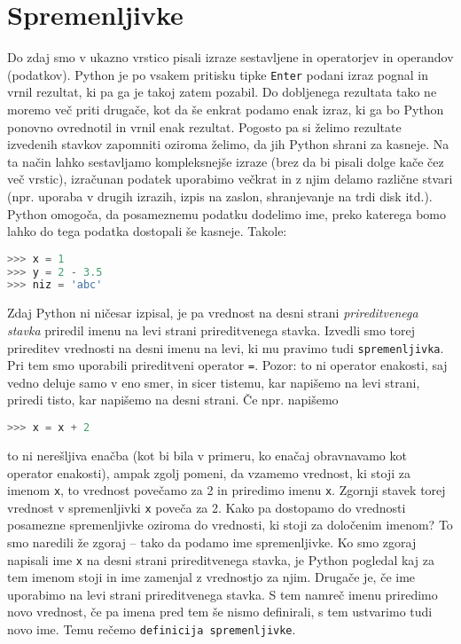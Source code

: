 \section{Spremenljivke}
Do zdaj smo v ukazno vrstico pisali izraze sestavljene in operatorjev in operandov (podatkov). Python je po vsakem pritisku tipke \texttt{Enter} podani izraz pognal in vrnil rezultat, ki pa ga je takoj zatem pozabil. Do dobljenega rezultata tako ne moremo več priti drugače, kot da še enkrat podamo enak izraz, ki ga bo Python ponovno ovrednotil in vrnil enak rezultat. Pogosto pa si želimo rezultate izvedenih stavkov zapomniti oziroma želimo, da jih Python shrani za kasneje. Na ta način lahko sestavljamo kompleksnejše izraze (brez da bi pisali dolge kače čez več vrstic), izračunan podatek uporabimo večkrat in z njim delamo različne stvari (npr. uporaba v drugih izrazih, izpis na zaslon, shranjevanje na trdi disk itd.). Python omogoča, da posameznemu podatku dodelimo ime, preko katerega bomo lahko do tega podatka dostopali še kasneje. Takole:
\begin{lstlisting}[language=Python]
>>> x = 1
>>> y = 2 - 3.5
>>> niz = 'abc'
\end{lstlisting}
Zdaj Python ni ničesar izpisal, je pa vrednost na desni strani \emph{prireditvenega stavka} priredil imenu na levi strani prireditvenega stavka. Izvedli smo torej prireditev vrednosti na desni imenu na levi, ki mu pravimo tudi \texttt{spremenljivka}. Pri tem smo uporabili prireditveni operator \texttt{=}. Pozor: to ni operator enakosti, saj vedno deluje samo v eno smer, in sicer tistemu, kar napišemo na levi strani, priredi tisto, kar napišemo na desni strani. Če npr. napišemo
\begin{lstlisting}[language=Python]
>>> x = x + 2
\end{lstlisting}
to ni nerešljiva enačba (kot bi bila v primeru, ko enačaj obravnavamo kot operator enakosti), ampak zgolj pomeni, da vzamemo vrednost, ki stoji za imenom \texttt{x}, to vrednost povečamo za 2 in priredimo imenu \texttt{x}. Zgornji stavek torej vrednost v spremenljivki \texttt{x} poveča za 2. Kako pa dostopamo do vrednosti posamezne spremenljivke oziroma do vrednosti, ki stoji za določenim imenom? To smo naredili že zgoraj -- tako da podamo ime spremenljivke. Ko smo zgoraj napisali ime \texttt{x} na desni strani prireditvenega stavka, je Python pogledal kaj za tem imenom stoji in ime zamenjal z vrednostjo za njim. Drugače je, če ime uporabimo na levi strani prireditvenega stavka. S tem namreč imenu priredimo novo vrednost, če pa imena pred tem še nismo definirali, s tem ustvarimo tudi novo ime. Temu rečemo \texttt{definicija spremenljivke}.

